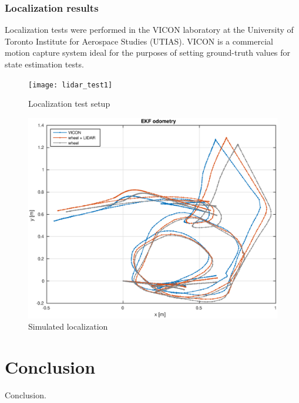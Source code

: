 \documentclass[times, utf8, diplomski, english]{fer}
\begin{document}
\subsection{Localization results}
Localization tests were performed in the VICON laboratory at the University of Toronto Institute for Aerospace Studies (UTIAS).
VICON is a commercial motion capture system ideal for the purposes of setting ground-truth values for state estimation tests. 
\begin{figure}[h]
\centering
\texttt{[image: lidar\_test1]}
\caption{Localization test setup}
\end{figure}
\begin{figure}[h]
\centering
\includegraphics[width=.75\textwidth]{thing_odometry_lidar}
\caption{Simulated localization}
\end{figure}





\chapter{Conclusion}
Conclusion.




\appendix
\end{document}
